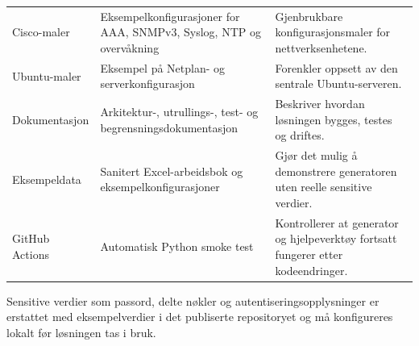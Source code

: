 \begin{table}[H]
\begin{tabular}{
        >{\raggedright\arraybackslash}p{3.2cm}
        >{\raggedright\arraybackslash}p{5.2cm}
        >{\raggedright\arraybackslash}p{6.0cm}
    }
        Cisco-maler &
        Eksempelkonfigurasjoner for AAA, SNMPv3, Syslog, NTP og overvåkning &
        Gjenbrukbare konfigurasjonsmaler for nettverksenhetene. \\

        Ubuntu-maler &
        Eksempel på Netplan- og serverkonfigurasjon &
        Forenkler oppsett av den sentrale Ubuntu-serveren. \\

        Dokumentasjon &
        Arkitektur-, utrullings-, test- og begrensningsdokumentasjon &
        Beskriver hvordan løsningen bygges, testes og driftes. \\

        Eksempeldata &
        Sanitert Excel-arbeidsbok og eksempelkonfigurasjoner &
        Gjør det mulig å demonstrere generatoren uten reelle sensitive verdier. \\

        GitHub Actions &
        Automatisk Python smoke test &
        Kontrollerer at generator og hjelpeverktøy fortsatt fungerer etter kodeendringer. \\

        \bottomrule
    \end{tabular}

\end{table}

Sensitive verdier som passord, delte nøkler og autentiseringsopplysninger er erstattet med eksempelverdier i det publiserte repositoryet og må konfigureres lokalt før løsningen tas i bruk.